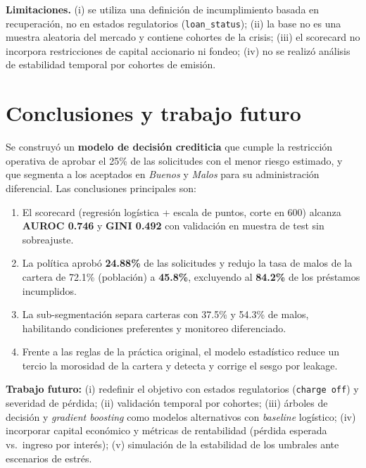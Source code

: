 \documentclass[11pt,letterpaper]{article}
\begin{document}
\textbf{Limitaciones.} (i) se utiliza una definición de incumplimiento basada
en recuperación, no en estados regulatorios (\texttt{loan\_status}); (ii) la
base no es una muestra aleatoria del mercado y contiene cohortes de la crisis;
(iii) el scorecard no incorpora restricciones de capital accionario ni
fondeo; (iv) no se realizó análisis de estabilidad temporal por cohortes de
emisión.

\section{Conclusiones y trabajo futuro}

Se construyó un \textbf{modelo de decisión crediticia} que cumple la
restricción operativa de aprobar el 25\% de las solicitudes con el menor
riesgo estimado, y que segmenta a los aceptados en \emph{Buenos} y \emph{Malos}
para su administración diferencial. Las conclusiones principales son:

\begin{enumerate}
  \item El scorecard (regresión logística + escala de puntos, corte en 600)
        alcanza \textbf{AUROC 0.746} y \textbf{GINI 0.492} con validación en
        muestra de test sin sobreajuste.
  \item La política aprobó \textbf{24.88\%} de las solicitudes y redujo la
        tasa de malos de la cartera de 72.1\% (población) a \textbf{45.8\%},
        excluyendo al \textbf{84.2\%} de los préstamos incumplidos.
  \item La sub-segmentación separa carteras con 37.5\% y 54.3\% de malos,
        habilitando condiciones preferentes y monitoreo diferenciado.
  \item Frente a las reglas de la práctica original, el modelo estadístico
        reduce un tercio la morosidad de la cartera y detecta y corrige el
        sesgo por leakage.
\end{enumerate}

\textbf{Trabajo futuro:} (i) redefinir el objetivo con estados regulatorios
(\texttt{charge off}) y severidad de pérdida; (ii) validación temporal por
cohortes; (iii) árboles de decisión y \emph{gradient boosting} como modelos
alternativos con \emph{baseline} logístico; (iv) incorporar capital económico
y métricas de rentabilidad (pérdida esperada vs.\ ingreso por interés);
(v) simulación de la estabilidad de los umbrales ante escenarios de estrés.
\end{document}

